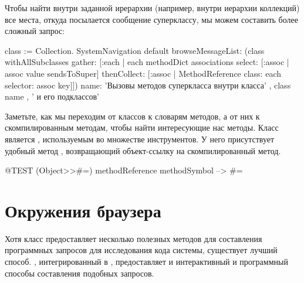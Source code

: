 \documentclass[a4paper,10pt,twoside]{book}
\begin{document}
{%

Чтобы найти внутри заданной ирерархии (например, внутри иерархии коллекций) все места, откуда посылается сообщение суперклассу, мы можем составить более сложный запрос:
\begin{code}{}
class := Collection.
SystemNavigation default
  browseMessageList: (class withAllSubclasses gather: [:each |
    each methodDict associations
      select: [:assoc | assoc value sendsToSuper]
      thenCollect: [:assoc | MethodReference class: each selector: assoc key]])
  name: 'Вызовы методов суперкласса внутри класса' , class name , ' и его подклассов'
\end{code}
Заметьте, как мы переходим от классов к словарям методов, а от них к скомпилированным методам, чтобы найти интересующие нас методы.
Класс  является , используемым во множестве инструментов.
У него присутствует удобный метод , возвращающий объект-ссылку на скомпилированный метод.
\begin{code}{@TEST}
(Object>>#=) methodReference methodSymbol --> #=
\end{code}

\section{Окружения браузера}

Хотя класс  предоставляет несколько полезных методов для составления программных запросов для исследования кода системы, существует лучший способ. , интегрированный в \pharo, предоставляет и интерактивный и программный способы составления подобных запросов.

}
\end{document}
